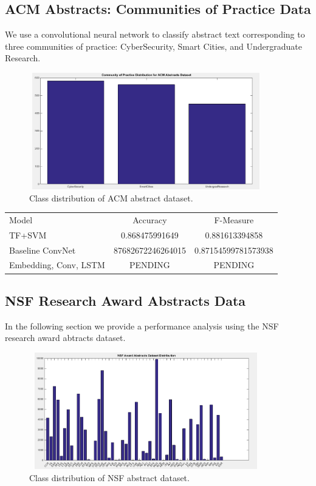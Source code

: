 \documentclass[12pt]{article}
\begin{document}
\subsection{ACM Abstracts: Communities of Practice Data}
We use a convolutional neural network to classify abstract text corresponding to three communities of practice: CyberSecurity,
Smart Cities, and Undergraduate Research.


\begin{figure}[H]
\centering
\includegraphics[height=2in, width=4in]{Images/ACM_CoP_distribution.png}
\caption{Class distribution of ACM abstract dataset.}
\end{figure}


\begin{tabular}[pos]{l c c}
  Model & Accuracy & F-Measure\\
  TF+SVM & 0.868475991649 & 0.881613394858\\
  Baseline ConvNet & 87682672246264015 & 0.87154599781573938\\
  Embedding, Conv, LSTM & PENDING & PENDING\\
\end{tabular}

\subsection{NSF Research Award Abstracts Data}
In the following section we provide a performance analysis using the NSF research award abtracts dataset.

\begin{figure}[H]
\centering
\includegraphics[height=2in, width=4in]{Images/NSF_Awards_distribution.png}
\caption{Class distribution of NSF abstract dataset.}
\end{figure}
\end{document}

